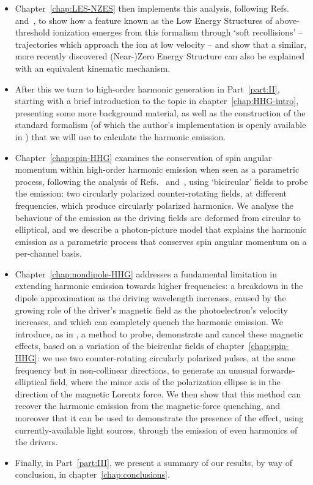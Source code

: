 \begin{itemize}
\item
Chapter~\ref{chap:LES-NZES} then implements this analysis, following Refs.~\citealp{Pisanty_slalom_2016} and~\citealp{Pisanty_kinematic_2016}, to show how a feature known as the Low Energy Structures of above-threshold ionization emerges from this formalism through `soft recollisions' -- trajectories which approach the ion at low velocity -- and show that a similar, more recently discovered \mbox{(Near-)Zero} Energy Structure can also be explained with an equivalent kinematic mechanism.

\item
After this we turn to high-order harmonic generation in Part~\ref{part:II}, starting with a brief introduction to the topic in chapter~\ref{chap:HHG-intro}, presenting some more background material, as well as the construction of the standard formalism (of which the author's implementation is openly available in ) that we will use to calculate the harmonic emission.

\item
Chapter~\ref{chap:spin-HHG} examines the conservation of spin angular momentum within high-order harmonic emission when seen as a parametric process, following the analysis of Refs.~\citealp{Ivanov_nature_photonics_2014} and~\citealp{ Pisanty_spin_conservation_2014}, using `bicircular' fields to probe the emission: two circularly polarized counter-rotating fields, at different frequencies, which produce circularly polarized harmonics. We analyse the behaviour of the emission as the driving fields are deformed from circular to elliptical, and we describe a photon-picture model that explains the harmonic emission as a parametric process that conserves spin angular momentum on a per-channel basis.

\item
Chapter~\ref{chap:nondipole-HHG} addresses a fundamental limitation in extending harmonic emission towards higher frequencies: a breakdown in the dipole approximation as the driving wavelength increases, caused by the growing role of the driver's magnetic field as the photoelectron's velocity increases, and which can completely quench the harmonic emission. We introduce, as in , a method to probe, demonstrate and cancel these magnetic effects, based on a variation of the bicircular fields of chapter~\ref{chap:spin-HHG}: we use two counter-rotating circularly polarized pulses, at the same frequency but in non-collinear directions, to generate an unusual forwards-elliptical field, where the minor axis of the polarization ellipse is in the direction of the magnetic Lorentz force. We then show that this method can recover the harmonic emission from the magnetic-force quenching, and moreover that it can be used to demonstrate the presence of the effect, using currently-available light sources, through the emission of even harmonics of the drivers.

\item Finally, in Part~\ref{part:III}, we present a summary of our results, by way of conclusion, in chapter~\ref{chap:conclusions}.

\end{itemize}




